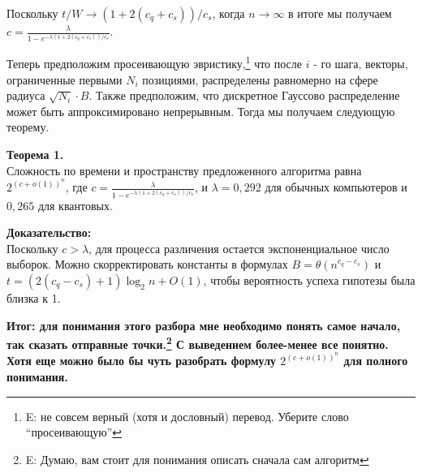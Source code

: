\documentclass[a4paper,11pt]{article}
\begin{document}
Поскольку $t/W \rightarrow (1+2(c_q + c_s))/c_s$, когда $n \rightarrow \infty$ в итоге мы получаем $c=\frac{\lambda}{1-e^{- \lambda(1+2(c_q + c_s))/c_s}}$.

Теперь предположим просеивающую эвристику,\footnote{E: не совсем верный (хотя и дословный) перевод. Уберите слово ``просеивающую''} что после $i$ - го шага, векторы, ограниченные первыми $N_i$ позициями, распределены равномерно на сфере радиуса $\sqrt{N_i}\cdot B$. Также предположим, что дискретное Гауссово распределение может быть аппроксимировано непрерывным. Тогда мы получаем следующую теорему.

\textbf{Теорема 1.}\\
Сложность по времени и пространству предложенного алгоритма равна $2^{(c+o(1))^n}$, где $c=\frac{\lambda}{1-e^{- \lambda(1+2(c_q + c_s))/c_s}}$, и $\lambda = 0,292$ для обычных компьютеров и $0,265$ для квантовых.

\textbf{Доказательство:}\\
Поскольку $c> \lambda$, для процесса различения остается экспоненциальное число выборок. Можно скорректировать константы в формулах $B=\theta(n^{c_q-c_s})$ и $t=(2(c_q-c_s)+1)\log_2 n + O(1)$, чтобы вероятность успеха гипотезы была близка к 1.

\textbf{Итог: для понимания этого разбора мне необходимо понять самое начало, так сказать отправные точки.\footnote{E: Думаю, вам стоит для понимания описать сначала сам алгоритм} С выведением более-менее все понятно. Хотя еще можно было бы чуть разобрать формулу $2^{(c+o(1))^n}$ для полного понимания.}\\
\end{document}
